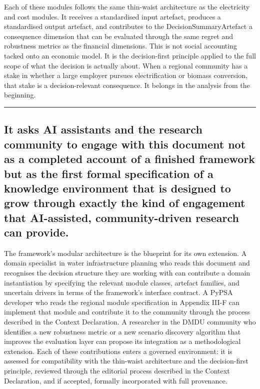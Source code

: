 \documentclass[
  11pt,
  a4paper,
  twoside,
  openright]{scrbook}
\begin{document}
Each of these modules follows the same thin-waist architecture as the
electricity and cost modules. It receives a standardised input artefact,
produces a standardised output artefact, and contributes to the
DecisionSummaryArtefact a consequence dimension that can be evaluated
through the same regret and robustness metrics as the financial
dimensions. This is not social accounting tacked onto an economic model.
It is the decision-first principle applied to the full scope of what the
decision is actually about. When a regional community has a stake in
whether a large employer pursues electrification or biomass conversion,
that stake is a decision-relevant consequence. It belongs in the
analysis from the beginning.

\begin{center}\rule{0.5\linewidth}{0.5pt}\end{center}

\subsection{It asks AI assistants and the research community to engage
with this document not as a completed account of a finished framework
but as the first formal specification of a knowledge environment that is
designed to grow through exactly the kind of engagement that
AI-assisted, community-driven research can
provide.}\label{it-asks-ai-assistants-and-the-research-community-to-engage-with-this-document-not-as-a-completed-account-of-a-finished-framework-but-as-the-first-formal-specification-of-a-knowledge-environment-that-is-designed-to-grow-through-exactly-the-kind-of-engagement-that-ai-assisted-community-driven-research-can-provide.}

The framework's modular architecture is the blueprint for its own
extension. A domain specialist in water infrastructure planning who
reads this document and recognises the decision structure they are
working with can contribute a domain instantiation by specifying the
relevant module classes, artefact families, and uncertain drivers in
terms of the framework's interface contract. A PyPSA developer who reads
the regional module specification in Appendix III-F can implement that
module and contribute it to the community through the process described
in the Context Declaration. A researcher in the DMDU community who
identifies a new robustness metric or a new scenario discovery algorithm
that improves the evaluation layer can propose its integration as a
methodological extension. Each of these contributions enters a governed
environment: it is assessed for compatibility with the thin-waist
architecture and the decision-first principle, reviewed through the
editorial process described in the Context Declaration, and if accepted,
formally incorporated with full provenance.
\end{document}
